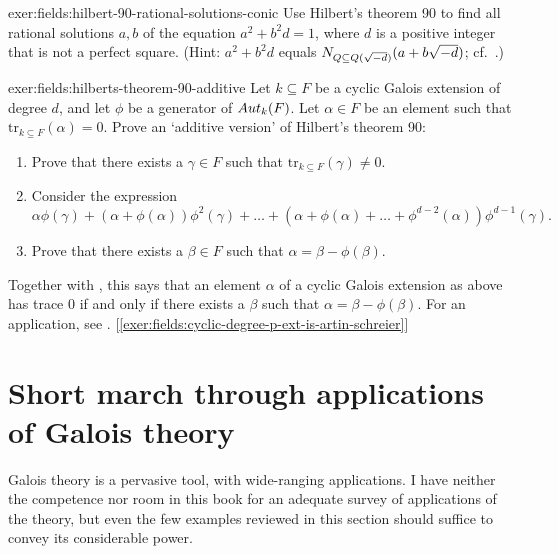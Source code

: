 \begin{exer}{}{exer:fields:hilbert-90-rational-solutions-conic}
  Use Hilbert's theorem 90 to find all rational solutions $a, b$ of
  the equation $a^2 + b^2 d = 1$, where $d$ is a positive integer that
  is not a perfect square. (Hint: $a^2 + b^2 d$ equals
  $N_{Q \subseteq Q(\sqrt{-d})}(a + b\sqrt{-d})$; cf.\
  .)
\end{exer}
\begin{exer}{}{exer:fields:hilberts-theorem-90-additive}
  Let $k \subseteq F$ be a cyclic Galois extension of degree $d$, and
  let $\phi$ be a generator of $Aut_k(F)$. Let $\alpha \in F$ be an
  element such that $\mathrm{tr}_{k \subseteq F}(\alpha) = 0$. Prove
  an `additive version' of Hilbert's theorem 90:
  \begin{enumerate}[label=(\roman*)]
  \item Prove that there exists a $\gamma \in F$ such that
    $\mathrm{tr}_{k \subseteq F}(\gamma) \neq 0$.
  \item Consider the expression
    \[
      \alpha\phi(\gamma) + (\alpha + \phi(\alpha))\phi^2(\gamma) +
      \dots + (\alpha + \phi(\alpha) + \dots + \phi^{d-2}(\alpha))
      \phi^{d-1}(\gamma).
    \]
  \item Prove that there exists a $\beta \in F$ such that
    $\alpha = \beta - \phi(\beta)$.
  \end{enumerate}
  Together with
  , this says
  that an element $\alpha$ of a cyclic Galois extension as above has
  trace $0$ if and only if there exists a $\beta$ such that
  $\alpha = \beta - \phi(\beta)$. For an application, see
  . [\ref{exer:fields:cyclic-degree-p-ext-is-artin-schreier}]
\end{exer}

\section{Short march through applications of Galois theory}
\label{sec:fields:short-march-through-applications-of-galois-theory}

Galois theory is a pervasive tool, with wide-ranging applications. I
have neither the competence nor room in this book for an adequate
survey of applications of the theory, but even the few examples
reviewed in this section should suffice to convey its considerable
power.

